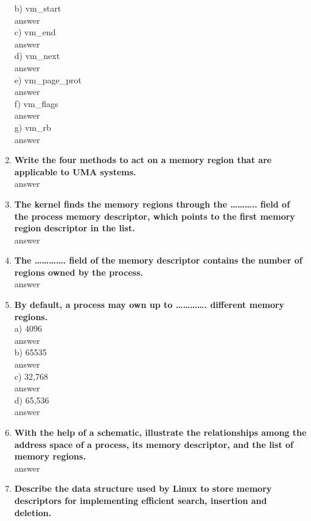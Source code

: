 \documentclass[a4paper,12pt]{article}
\begin{document}
\begin{flushleft}
\begin{enumerate}
b) vm\_start \\
{\color{red}answer}\\
c) vm\_end \\
{\color{red}answer}\\
d) vm\_next \\
{\color{red}answer}\\
e) vm\_page\_prot\\
{\color{red}answer}\\
f) vm\_flags \\
{\color{red}answer}\\
g) vm\_rb\\
{\color{red}answer}\\
\item \textbf{ Write the four methods to act on a memory region that are applicable to UMA systems.}\\
{\color{red}answer}\\
\item \textbf{ The kernel finds the memory regions through the ……….. field of the process memory descriptor, which points to the first memory region descriptor in the list.}\\
{\color{red}answer}\\
\item \textbf{ The …………. field of the memory descriptor contains the number of regions owned by the process.}\\
{\color{red}answer}\\
\item \textbf{ By default, a process may own up to …………. different memory regions.}\\
a) 4096 \\
{\color{red}answer}\\
b) 65535 \\
{\color{red}answer}\\
c) 32,768 \\
{\color{red}answer}\\
d) 65,536\\
{\color{red}answer}\\
\item \textbf{ With the help of a schematic, illustrate the relationships among the address space of a process, its memory descriptor, and the list of memory regions.}\\
{\color{red}answer}\\
\item \textbf{ Describe the data structure used by Linux to store memory descriptors for implementing efficient search, insertion and deletion.}\\

\end{enumerate}
\end{flushleft}
\end{document}
